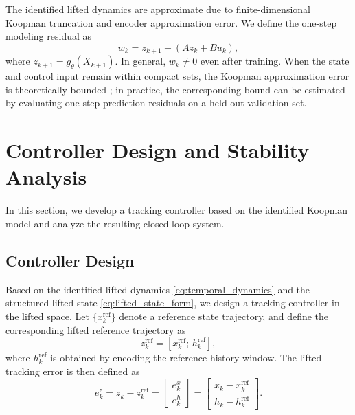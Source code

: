 \documentclass[journal]{IEEEtran}
\begin{document}
The identified lifted dynamics are approximate due to finite-dimensional Koopman truncation and encoder approximation error. We define the one-step modeling residual as
\begin{equation}
    w_k = z_{k+1} - (A z_k + B u_k),
    \label{eq:modeling_error}
\end{equation}
where $z_{k+1} = g_\theta(X_{k+1})$. In general, $w_k \neq 0$ even after training. When the state and control input remain within compact sets, the Koopman approximation error is theoretically bounded \cite{korda2018linear}; in practice, the corresponding bound can be estimated by evaluating one-step prediction residuals on a held-out validation set.

\section{Controller Design and Stability Analysis}
\label{sec:control}

In this section, we develop a tracking controller based on the identified Koopman model and analyze the resulting closed-loop system.

\subsection{Controller Design}
\label{subsec:controller_design}

Based on the identified lifted dynamics \eqref{eq:temporal_dynamics} and the structured lifted state \eqref{eq:lifted_state_form}, we design a tracking controller in the lifted space. Let $\{x_k^{\mathrm{ref}}\}$ denote a reference state trajectory, and define the corresponding lifted reference trajectory as
\begin{equation}
    z_k^{\mathrm{ref}} = [x_k^{\mathrm{ref}};\,h_k^{\mathrm{ref}}],
    \label{eq:lifted_reference}
\end{equation}
where $h_k^{\mathrm{ref}}$ is obtained by encoding the reference history window. The lifted tracking error is then defined as
\begin{equation}
    e_k^z = z_k - z_k^{\mathrm{ref}}
    =
    \begin{bmatrix}
        e_k^x \\ e_k^h
    \end{bmatrix}
    =
    \begin{bmatrix}
        x_k - x_k^{\mathrm{ref}} \\
        h_k - h_k^{\mathrm{ref}}
    \end{bmatrix}.
    \label{eq:structured_error}
\end{equation}
\end{document}
